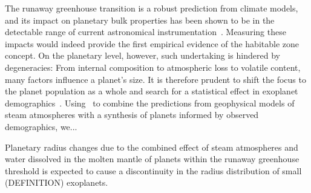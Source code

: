 \documentclass[twocolumn,twocolappendix]{aastex631}
\begin{document}
\begin{note}
    The runaway greenhouse transition is a robust prediction from climate models, and its impact on planetary bulk properties has been shown to be in the detectable range of current astronomical instrumentation~\citep{Goldblatt2015}.
Measuring these impacts would indeed provide the first empirical evidence of the habitable zone concept.
On the planetary level, however, such undertaking is hindered by degeneracies: From internal composition to atmospheric loss to volatile content, many factors influence a planet's size.
It is therefore prudent to shift the focus to the planet population as a whole and search for a statistical effect in exoplanet demographics~\citep{Turbet2019}.
 Using \bioverse\ to combine the predictions from geophysical models of steam atmospheres with a synthesis of planets informed by observed demographics, we...



    Planetary radius changes due to the combined effect of steam atmospheres and water dissolved in the molten mantle of planets within the runaway greenhouse threshold is expected to cause a discontinuity in the radius distribution of small (DEFINITION) exoplanets.


\end{note}
\end{document}
